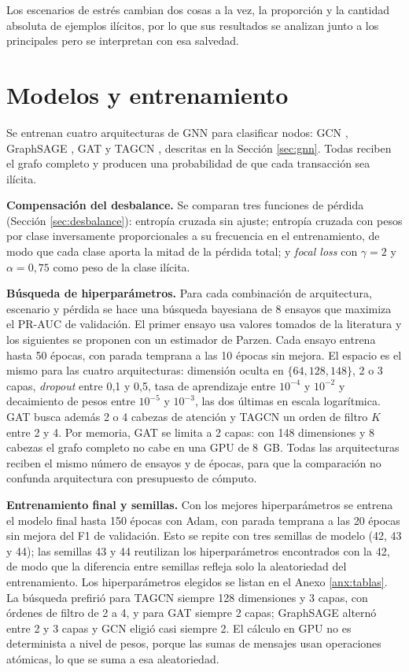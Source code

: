 Los escenarios de estrés cambian dos cosas a la vez, la proporción y la cantidad absoluta de
ejemplos ilícitos, por lo que sus resultados se analizan junto a los principales pero se
interpretan con esa salvedad.

\section{Modelos y entrenamiento}\label{sec:entrenamiento}

Se entrenan cuatro arquitecturas de GNN para clasificar nodos: GCN \cite{Kipf2017GCN},
GraphSAGE \cite{Hamilton2017GraphSAGE}, GAT \cite{Velickovic2018GAT} y TAGCN
\cite{Du2017TAGCN}, descritas en la Sección \ref{sec:gnn}. Todas reciben el grafo completo y
producen una probabilidad de que cada transacción sea ilícita.

\textbf{Compensación del desbalance.} Se comparan tres funciones de pérdida (Sección
\ref{sec:desbalance}): entropía cruzada sin ajuste; entropía cruzada con pesos por clase
inversamente proporcionales a su frecuencia en el entrenamiento, de modo que cada clase aporta
la mitad de la pérdida total; y \textit{focal loss} \cite{Lin2020Focal} con $\gamma = 2$ y
$\alpha = 0{,}75$ como peso de la clase ilícita.

\textbf{Búsqueda de hiperparámetros.} Para cada combinación de arquitectura, escenario y
pérdida se hace una búsqueda bayesiana de 8 ensayos que maximiza el PR-AUC de validación.
El primer ensayo usa valores tomados de la literatura y los siguientes se proponen con un
estimador de Parzen. Cada ensayo entrena hasta 50 épocas, con parada temprana a las 10 épocas
sin mejora. El espacio es el mismo para las cuatro arquitecturas: dimensión oculta en
$\{64, 128, 148\}$, 2 o 3 capas, \textit{dropout} entre 0,1 y 0,5, tasa de aprendizaje entre
$10^{-4}$ y $10^{-2}$ y decaimiento de pesos entre $10^{-5}$ y $10^{-3}$, las dos últimas en
escala logarítmica. GAT busca además 2 o 4 cabezas de atención y TAGCN un orden de filtro $K$
entre 2 y 4. Por memoria, GAT se limita a 2 capas: con 148 dimensiones y 8 cabezas el
grafo completo no cabe en una GPU de 8~GB. Todas las arquitecturas reciben el mismo número de
ensayos y de épocas, para que la comparación no confunda arquitectura con presupuesto de
cómputo.

\textbf{Entrenamiento final y semillas.} Con los mejores hiperparámetros se entrena el modelo
final hasta 150 épocas con Adam, con parada temprana a las 20 épocas sin mejora del F1 de
validación. Esto se repite con tres semillas de modelo (42, 43 y 44); las semillas 43 y 44
reutilizan los hiperparámetros encontrados con la 42, de modo que la diferencia entre semillas
refleja solo la aleatoriedad del entrenamiento. Los hiperparámetros elegidos se listan en el Anexo
\ref{anx:tablas}. La búsqueda prefirió para TAGCN siempre 128 dimensiones y 3 capas, con órdenes
de filtro de 2 a 4, y para GAT siempre 2 capas; GraphSAGE alternó entre 2 y 3 capas y GCN eligió
casi siempre 2. El cálculo en GPU no es determinista a nivel de
pesos, porque las sumas de mensajes usan operaciones atómicas, lo que se suma a esa
aleatoriedad.

